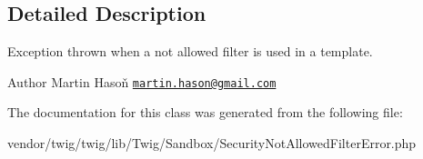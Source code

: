 \subsection{Detailed Description}
Exception thrown when a not allowed filter is used in a template.

\begin{DoxyAuthor}{Author}
Martin Hasoň \href{mailto:martin.hason@gmail.com}{\tt martin.\+hason@gmail.\+com} 
\end{DoxyAuthor}


The documentation for this class was generated from the following file\+:\begin{DoxyCompactItemize}
\item 
vendor/twig/twig/lib/\+Twig/\+Sandbox/Security\+Not\+Allowed\+Filter\+Error.\+php\end{DoxyCompactItemize}
